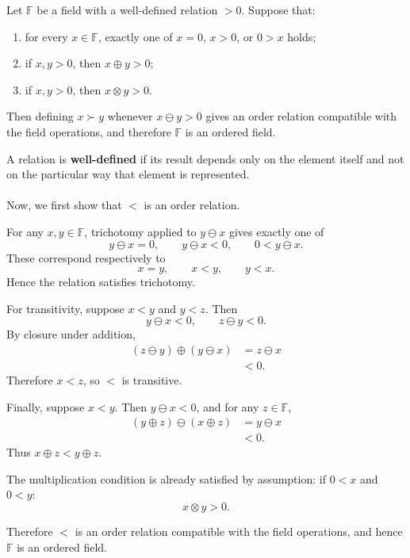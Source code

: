 \begin{theorem}\label{th:ordered-field-criterion}
Let $\mathbb{F}$ be a field with a well-defined relation $>0$. Suppose that:
\begin{enumerate}[label=\roman*)]
\item for every $x\in\mathbb{F}$, exactly one of $x=0$, $x>0$, or $0> x$ holds;
\item if $x,y>0$, then $x\oplus y>0$;
\item if $x,y>0$, then $x\otimes y>0$.
\end{enumerate}

Then defining $x\succ y$ whenever $x \ominus y>0$ gives an order relation compatible with the field operations, and therefore $\mathbb{F}$ is an ordered field.
\end{theorem}

\begin{bookproof}
A relation is \textbf{well-defined} if its result depends only on the element itself and not on the particular way that element is represented.\\\\
Now, we first show that $<$ is an order relation.

For any $x,y\in\mathbb{F}$, trichotomy applied to $y\ominus x$ gives exactly one of
$$
y\ominus x=0,\qquad y\ominus x<0,\qquad 0< y\ominus x.
$$
These correspond respectively to
$$
x=y,\qquad x< y,\qquad y< x.
$$
Hence the relation satisfies trichotomy.

For transitivity, suppose $x< y$ and $y< z$. Then
$$
y\ominus x<0,\qquad z\ominus y<0.
$$
By closure under addition,
\begin{align*}
(z\ominus y)\oplus(y\ominus x)
&=z\ominus x\\
&<0.
\end{align*}
Therefore $x< z$, so $<$ is transitive.

Finally, suppose $x< y$. Then $y\ominus x<0$, and for any $z\in\mathbb{F}$,
\begin{align*}
(y\oplus z)\ominus(x\oplus z)
&=y\ominus x\\
&<0.
\end{align*}
Thus $x\oplus z< y\oplus z$.

The multiplication condition is already satisfied by assumption: if $0< x$ and $0< y$:
$$
x\otimes y > 0.
$$

Therefore $<$ is an order relation compatible with the field operations, and hence $\mathbb{F}$ is an ordered field.
\end{bookproof}

